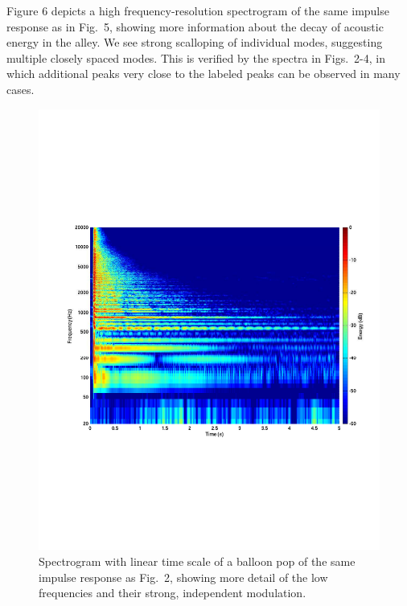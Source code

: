 \documentclass{aes137}
\begin{document}
Figure 6 depicts a high frequency-resolution spectrogram of the same
impulse response as in Fig.~5, showing more information about the
decay of acoustic energy in the alley. We see strong scalloping of
individual modes, suggesting multiple closely spaced modes. This is
verified by the spectra in Figs.~2-4, in which additional peaks very
close to the labeled peaks can be observed in many cases.

%

\begin{figure}[h!] \centering \includegraphics[width=\linewidth]{images/P14IR_sgm_cropped.pdf} \caption{Spectrogram with linear time scale of a balloon pop of the same impulse response as Fig.~2, showing more detail of the low frequencies and their strong, independent modulation.} \end{figure}
\end{document}
